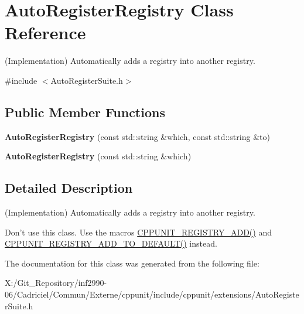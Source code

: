 \hypertarget{class_auto_register_registry}{\section{Auto\-Register\-Registry Class Reference}
\label{class_auto_register_registry}
}


(Implementation) Automatically adds a registry into another registry.  




{\ttfamily \#include $<$Auto\-Register\-Suite.\-h$>$}

\subsection*{Public Member Functions}
\begin{DoxyCompactItemize}
\item 
\hypertarget{class_auto_register_registry_aeb3c0171549420bc18714d4117d9c2b5}{{\bfseries Auto\-Register\-Registry} (const std\-::string \&which, const std\-::string \&to)}\label{class_auto_register_registry_aeb3c0171549420bc18714d4117d9c2b5}

\item 
\hypertarget{class_auto_register_registry_a3efb50c6218f5d0e5969eb6fc8bccb23}{{\bfseries Auto\-Register\-Registry} (const std\-::string \&which)}\label{class_auto_register_registry_a3efb50c6218f5d0e5969eb6fc8bccb23}

\end{DoxyCompactItemize}


\subsection{Detailed Description}
(Implementation) Automatically adds a registry into another registry. 

Don't use this class. Use the macros \hyperlink{_helper_macros_8h_a0785e2e8a821f70c69a8127c35c0a667}{C\-P\-P\-U\-N\-I\-T\-\_\-\-R\-E\-G\-I\-S\-T\-R\-Y\-\_\-\-A\-D\-D()} and \hyperlink{_helper_macros_8h_a9c3be3389213e1dc823ed580cc60878f}{C\-P\-P\-U\-N\-I\-T\-\_\-\-R\-E\-G\-I\-S\-T\-R\-Y\-\_\-\-A\-D\-D\-\_\-\-T\-O\-\_\-\-D\-E\-F\-A\-U\-L\-T()} instead. 

The documentation for this class was generated from the following file\-:\begin{DoxyCompactItemize}
\item 
X\-:/\-Git\-\_\-\-Repository/inf2990-\/06/\-Cadriciel/\-Commun/\-Externe/cppunit/include/cppunit/extensions/Auto\-Register\-Suite.\-h\end{DoxyCompactItemize}
